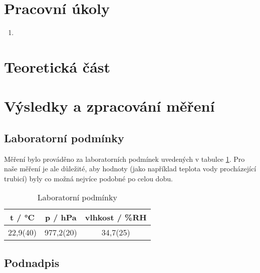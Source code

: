 \section{Pracovní úkoly}

\begin{enumerate}
\item 


\end{enumerate}

\section{Teoretická část}

\section{Výsledky a zpracování měření}

\subsection{Laboratorní podmínky}

    Měření bylo prováděno za laboratorních podmínek uvedených v tabulce \ref{tab:lab_pod}. Pro naše měření je ale důležité, aby hodnoty (jako například teplota vody procházející  trubicí) byly co možná nejvíce podobné po celou dobu.

    \begin{table}[h]
        \centering
        \caption{Laboratorní podmínky}
        \label{tab:lab_pod}
        \begin{tabular}{|c|c|c|} 
        \hline
            t / °C & p / hPa & vlhkost / \%RH  \\ 
        \hline
            22,9(40)   & 977,2(20)   & 34,7(25)            \\
        \hline
        \end{tabular}
    \end{table}

\subsection{Podnadpis}

